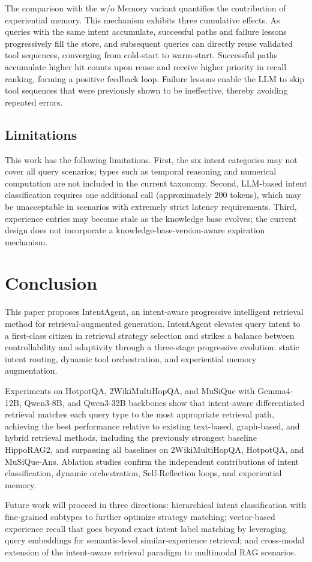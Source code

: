 \documentclass[runningheads]{llncs}
\begin{document}
The comparison with the w/o Memory variant quantifies the contribution of experiential memory. This mechanism exhibits three cumulative effects. As queries with the same intent accumulate, successful paths and failure lessons progressively fill the store, and subsequent queries can directly reuse validated tool sequences, converging from cold-start to warm-start. Successful paths accumulate higher hit counts upon reuse and receive higher priority in recall ranking, forming a positive feedback loop. Failure lessons enable the LLM to skip tool sequences that were previously shown to be ineffective, thereby avoiding repeated errors.

\subsection{Limitations}

This work has the following limitations. First, the six intent categories may not cover all query scenarios; types such as temporal reasoning and numerical computation are not included in the current taxonomy. Second, LLM-based intent classification requires one additional call (approximately 200 tokens), which may be unacceptable in scenarios with extremely strict latency requirements. Third, experience entries may become stale as the knowledge base evolves; the current design does not incorporate a knowledge-base-version-aware expiration mechanism.

\section{Conclusion}

This paper proposes IntentAgent, an intent-aware progressive intelligent retrieval method for retrieval-augmented generation. IntentAgent elevates query intent to a first-class citizen in retrieval strategy selection and strikes a balance between controllability and adaptivity through a three-stage progressive evolution: static intent routing, dynamic tool orchestration, and experiential memory augmentation.

Experiments on HotpotQA, 2WikiMultiHopQA, and MuSiQue with Gemma4-12B, Qwen3-8B, and Qwen3-32B backbones show that intent-aware differentiated retrieval matches each query type to the most appropriate retrieval path, achieving the best performance relative to existing text-based, graph-based, and hybrid retrieval methods, including the previously strongest baseline HippoRAG2, and surpassing all baselines on 2WikiMultiHopQA, HotpotQA, and MuSiQue-Ans. Ablation studies confirm the independent contributions of intent classification, dynamic orchestration, Self-Reflection loops, and experiential memory.

Future work will proceed in three directions: hierarchical intent classification with fine-grained subtypes to further optimize strategy matching; vector-based experience recall that goes beyond exact intent label matching by leveraging query embeddings for semantic-level similar-experience retrieval; and cross-modal extension of the intent-aware retrieval paradigm to multimodal RAG scenarios.



\end{document}
